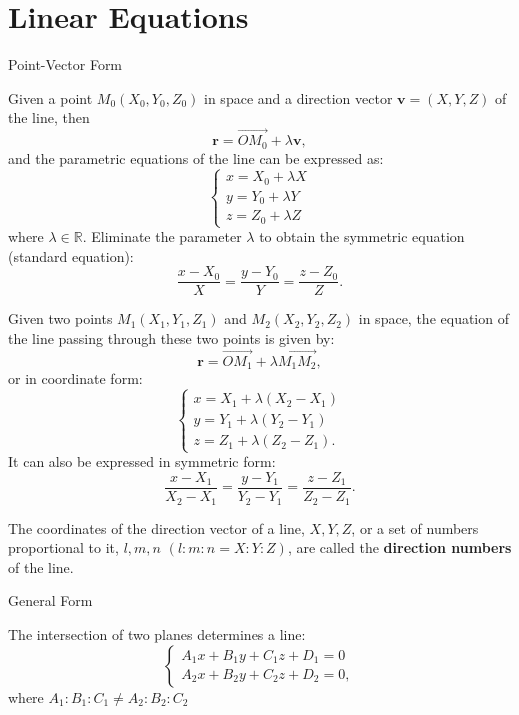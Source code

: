 \documentclass[11pt]{../../TexTemplate/elegantbook} %
\begin{document}
\section{Linear Equations}
\begin{leftbarTitle}{Point-Vector Form}\end{leftbarTitle}
Given a point \(M_{0}(X_{0}, Y_{0}, Z_{0})\) in space and a direction vector \(\mathbf{v} = (X, Y, Z)\) of the line, 
then
\[
\mathbf{r} = \vec{OM_{0}} + \lambda \mathbf{v},
\]
and the parametric equations of the line can be expressed as:
\[
\begin{cases}
x = X_{0} + \lambda X \\
y = Y_{0} + \lambda Y \\
z = Z_{0} + \lambda Z
\end{cases}
\]
where \(\lambda \in \mathbb{R}\).
Eliminate the parameter \(\lambda\) to obtain the symmetric equation (standard equation):
\begin{equation}\label{eq:LineSymmetricForm}
    \frac{x - X_{0}}{X} = \frac{y - Y_{0}}{Y} = \frac{z - Z_{0}}{Z}.
\end{equation}

\vspace{0.7cm}
Given two points \(M_{1}(X_{1}, Y_{1}, Z_{1})\) and \(M_{2}(X_{2}, Y_{2}, Z_{2})\) in space,
the equation of the line passing through these two points is given by:
\[
\mathbf{r} = \vec{OM_{1}} + \lambda \vec{M_{1}M_{2}},
\]
or in coordinate form:
\[
\begin{cases}
x = X_{1} + \lambda (X_{2} - X_{1}) \\
y = Y_{1} + \lambda (Y_{2} - Y_{1}) \\
z = Z_{1} + \lambda (Z_{2} - Z_{1}).
\end{cases}
\]
It can also be expressed in symmetric form:
\[
\frac{x - X_{1}}{X_{2} - X_{1}} = \frac{y - Y_{1}}{Y_{2} - Y_{1}} = \frac{z - Z_{1}}{Z_{2} - Z_{1}}.
\]

The coordinates of the direction vector of a line, \(X, Y, Z\), or a set of numbers proportional to it, 
\(l, m, n\) \((l : m : n = X : Y : Z)\), are called the \textbf{direction numbers} of the line.

\begin{leftbarTitle}{General Form}\end{leftbarTitle}
The intersection of two planes determines a line:
\[
\begin{cases}
A_{1}x + B_{1}y + C_{1}z + D_{1} = 0 \\
A_{2}x + B_{2}y + C_{2}z + D_{2} = 0,
\end{cases}
\]
where \(A_{1} : B_{1} : C_{1} \neq A_{2} : B_{2} : C_{2}\)
\end{document}
